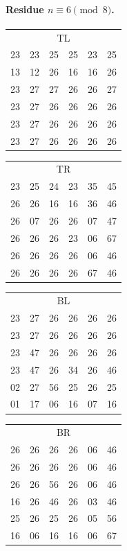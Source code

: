 \paragraph{Residue $n\equiv 6\pmod 8$.}
\begin{center}\scriptsize\ttfamily
\begin{tabular}[t]{@{}c@{\,}c@{\,}c@{\,}c@{\,}c@{\,}c@{}}\multicolumn{6}{c}{\normalfont\scriptsize TL}\\
23 & 23 & 25 & 25 & 23 & 25\\
13 & 12 & 26 & 16 & 16 & 26\\
23 & 27 & 27 & 26 & 26 & 27\\
23 & 27 & 26 & 26 & 26 & 26\\
23 & 27 & 26 & 26 & 26 & 26\\
23 & 27 & 26 & 26 & 26 & 26\end{tabular}\qquad
\begin{tabular}[t]{@{}c@{\,}c@{\,}c@{\,}c@{\,}c@{\,}c@{}}\multicolumn{6}{c}{\normalfont\scriptsize TR}\\
23 & 25 & 24 & 23 & 35 & 45\\
26 & 26 & 16 & 16 & 36 & 46\\
26 & 07 & 26 & 26 & 07 & 47\\
26 & 26 & 26 & 23 & 06 & 67\\
26 & 26 & 26 & 26 & 06 & 46\\
26 & 26 & 26 & 26 & 67 & 46\end{tabular}\qquad
\begin{tabular}[t]{@{}c@{\,}c@{\,}c@{\,}c@{\,}c@{\,}c@{}}\multicolumn{6}{c}{\normalfont\scriptsize BL}\\
23 & 27 & 26 & 26 & 26 & 26\\
23 & 27 & 26 & 26 & 26 & 26\\
23 & 47 & 26 & 26 & 26 & 26\\
23 & 47 & 26 & 34 & 26 & 46\\
02 & 27 & 56 & 25 & 26 & 25\\
01 & 17 & 06 & 16 & 07 & 16\end{tabular}\qquad
\begin{tabular}[t]{@{}c@{\,}c@{\,}c@{\,}c@{\,}c@{\,}c@{}}\multicolumn{6}{c}{\normalfont\scriptsize BR}\\
26 & 26 & 26 & 26 & 06 & 46\\
26 & 26 & 26 & 26 & 06 & 46\\
26 & 26 & 56 & 26 & 06 & 46\\
16 & 26 & 46 & 26 & 03 & 46\\
25 & 26 & 25 & 26 & 05 & 56\\
16 & 06 & 16 & 16 & 06 & 67\end{tabular}
\end{center}
